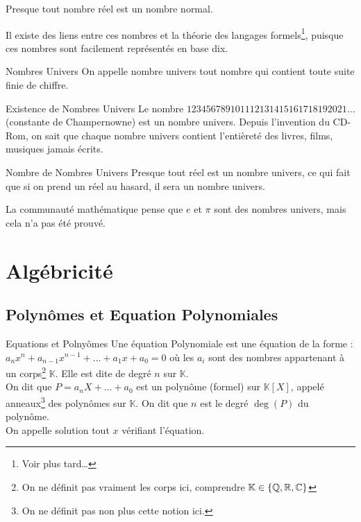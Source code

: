 \documentclass{cours}
\renewcommand*{\K}{\mathbb{K}}
\begin{document}
    Presque tout nombre réel est un nombre normal.

    Il existe des liens entre ces nombres et la théorie des langages formels\footnote{Voir plus tard\dots}, puisque ces nombres sont \og facilement \fg représentés en base dix.    

    \begin{définition}{Nombres Univers}{}
        On appelle nombre univers tout nombre qui contient toute suite finie de chiffre.
    \end{définition}

    \begin{propositionfr}{Existence de Nombres Univers}{}
        Le nombre $123456789101112131415161718192021\ldots$ (constante de Champernowne) est un nombre univers. Depuis l'invention du CD-Rom, on sait que chaque nombre univers contient l'entièreté des livres, films, musiques jamais écrits.
    \end{propositionfr}
    \begin{propositionfr}{Nombre de Nombres Univers}{}
        Presque tout réel est un nombre univers, ce qui fait que si on prend un réel au hasard, il sera un nombre univers.
    \end{propositionfr}
    \begin{remarque}{}{}
        La communauté mathématique pense que $e$ et $\pi$ sont des nombres univers, mais cela n'a pas été prouvé.
    \end{remarque}

    \section{Algébricité}
    \subsection{Polynômes et Equation Polynomiales}
    \begin{définition}{Equations et Polnyômes}{}
        Une équation Polynomiale est une équation de la forme : $a_{n}x^{n} + a_{n-1}x^{n-1} + \ldots + a_{1}x + a_{0} = 0$ où les $a_{i}$ sont des nombres appartenant à un corps\footnote{On ne définit pas vraiment les corps ici, comprendre $\K \in \left\{\Q, \R, \C\right\}$} $\K$. Elle est dite de degré $n$ sur $\K$. \\ 
        On dit que $P = a_{n}X + \ldots + a_{0}$ est un polynôme (formel) sur $\K\left[X\right]$, appelé anneaux\footnote{On ne définit pas non plus cette notion ici.} des polynômes sur $\K$. On dit que $n$ est le degré $\deg(P)$ du polynôme.\\
        On appelle solution tout $x$ vérifiant l'équation.
    \end{définition}   
    
\end{document}
